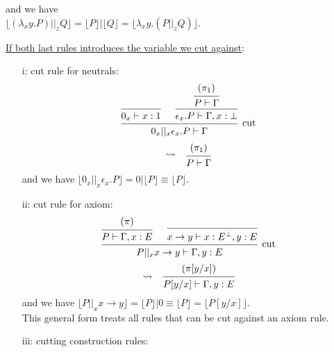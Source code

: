 \documentclass[a4paper,12pt]{article}
\begin{document}
\begin{myproof}
\begin{itemize}
		and we have\\
		$\lfloor (\lambda_xy.P)||_zQ \rfloor = \lfloor P \rfloor | \lfloor Q \rfloor = \lfloor \lambda_xy.(P||_zQ) \rfloor$.
	\end{itemize}
	\underline{If both last rules introduces the variable we cut against}:
	\begin{itemize}
		\item[i:] cut rule for neutrals:
			\[
				\begin{prooftree}
					\infer0{0_x \vdash x:1}
							\hypo{(\pi_1)}
						\infer1{P \vdash \Gamma}
					\infer1{\epsilon_x.P \vdash \Gamma,x:\bot}
				\infer2[cut]{0_x||_x\epsilon_x.P \vdash \Gamma}
				\end{prooftree}
			\]\[
				\leadsto\;\;\;
				\begin{prooftree}
					\hypo{(\pi_1)}
				\infer1{P \vdash \Gamma}
				\end{prooftree}
			\]
			and we have $\lfloor 0_x||_x\epsilon_x.P \rfloor = 0|\lfloor P \rfloor \equiv \lfloor P \rfloor$.
		\item[ii:] cut rule for axiom:
			\[
				\begin{prooftree}
						\hypo{(\pi)}
					\infer1{P \vdash \Gamma,x:E}
					\infer0{x\to y \vdash x:E^\bot,y:E}
				\infer2[cut]{P||_xx\to y \vdash \Gamma,y:E}
				\end{prooftree}
			\]\[
				\leadsto\;\;\;
				\begin{prooftree}
					\hypo{(\pi[y/x])}
				\infer1{P[y/x] \vdash \Gamma,y:E}
				\end{prooftree}
			\]
			and we have $\lfloor P||_xx\to y \rfloor = \lfloor P \rfloor|0 \equiv \lfloor P \rfloor = \lfloor P[y/x] \rfloor$.\\
			This general form treats all rules that can be cut against an axiom rule.
		\item[iii:] cutting construction rules:

\end{itemize}
\end{myproof}
\end{document}
